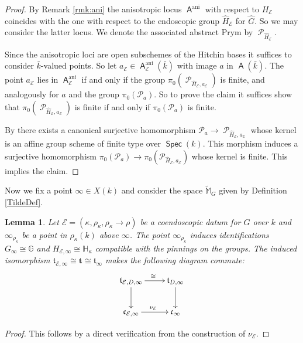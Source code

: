 \documentclass{article}
\DeclareMathOperator{\A}{\mathsf{A}}
\DeclareMathOperator{\ani}{ani}
\DeclareMathOperator{\Pc}{\mathcal{P}}
\DeclareMathOperator{\Spec}{\mathsf{Spec}}
\newcommand{\BG}{{\mathbb{G}}}
\newcommand{\BH}{{\mathbb{H}}}
\newcommand{\BM}{{\mathbb{M}}}
\newcommand{\CE}{{\mathcal E}}
\theoremstyle{definition}
\theoremstyle{plain}
\newtheorem{lemma}[definition]{Lemma}
\begin{document}
\begin{proof}
By Remark \ref{rmk:ani} the anisotropic locus $\A^{\ani}$ with respect to $H_\CE$ coincides with the one with respect to the endoscopic group $\widehat H_\CE$ for $\widehat G$. So we may consider the latter locus. We denote the associated abstract Prym by $\Pc_{\widehat H_\CE}$.

 Since the anisotropic loci are open subschemes of the Hitchin bases it suffices to consider $\bar k$-valued points. So let $a_{\CE} \in \A^{\ani}_{\CE}(\bar k)$ with image $a$ in $\A(\bar k)$. The point $a_{\CE}$ lies in $\A^{\ani}_{\CE}$ if and only if the group $\pi_0(\Pc_{\widehat H_\CE,a_\CE})$ is finite, and analogously for $a$ and the group $\pi_0(\mathcal{P}_a)$. So to prove the claim it suffices show that $\pi_0(\Pc_{\widehat H_\CE,a_\CE})$ is finite if and only if $\pi_0(\mathcal{P}_a)$ is finite.

 By \cite[4.17.2]{MR2653248} there exists a canonical surjective homomorphism $\mathcal{P}_a \to \Pc_{\widehat H_\CE,a_\CE}$ whose kernel is an affine group scheme of finite type over $\Spec(k)$. This morphism induces a surjective homomorphism $\pi_0(\mathcal{P}_a) \to \pi_0(\mathcal{P}_{\widehat H_\CE,a_\CE})$ whose kernel is finite. This implies the claim.
\end{proof}


Now we fix a point $\infty \in X(k)$ and consider the space $\widetilde{\BM}_G$ given by Definition \ref{TildeDef}. 
\begin{lemma} \label{BlaComp}
  Let $\CE=(\kappa,\rho_\kappa,\rho_\kappa \to \rho)$ be a coendoscopic datum for $G$ over $k$ and $\infty_{\rho_\kappa}$ be a point in $\rho_\kappa(k)$ above $\infty$. The point $\infty_{\rho_\kappa}$ induces identifications $G_\infty \cong \BG$ and $H_{\CE,\infty} \cong \BH_\kappa$ compatible with the pinnings on the groups. The induced isomorphism $\mathfrak{t}_{\CE,\infty} \cong \mathbf{t} \cong \mathfrak{t}_\infty$ makes the following diagram commute:
  \begin{equation*}
    \xymatrix{
      \mathfrak{t}_{\CE,D,\infty} \ar[r]^\cong \ar[d] & \mathfrak{t}_{D,\infty} \ar[d] \\
      \mathfrak{c}_{\CE,\infty} \ar[r]^{\nu_\CE} & \mathfrak{c}_\infty
}
  \end{equation*}
\end{lemma}
\begin{proof}
  This follows by a direct verification from the construction of $\nu_\CE$.
\end{proof}
\end{document}
